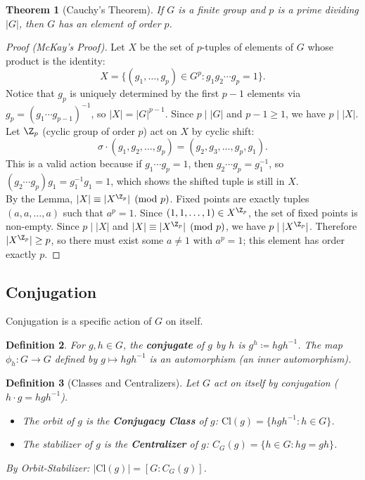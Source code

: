 \documentclass[a4paper,12pt]{article}
\newtheorem{thm}{Theorem}[section]
\newtheorem{defn}[thm]{Definition}
\begin{document}
\begin{thm}[Cauchy's Theorem]
    If $G$ is a finite group and $p$ is a prime dividing $|G|$, then $G$ has an element of order $p$.
\end{thm}
\begin{proof}[Proof (McKay's Proof)]
    Let $X$ be the set of $p$-tuples of elements of $G$ whose product is the identity:
    \[ X = \{(g_1, \dots, g_p) \in G^p : g_1 g_2 \cdots g_p = 1\}. \]
    Notice that $g_p$ is uniquely determined by the first $p-1$ elements via $g_p = (g_1 \cdots g_{p-1})^{-1}$, so $|X| = |G|^{p-1}$. Since $p \mid |G|$ and $p-1 \geq 1$, we have $p \mid |X|$. \\
    Let $\Z_p$ (cyclic group of order $p$) act on $X$ by cyclic shift:
    \[ \sigma \cdot (g_1, g_2, \dots, g_p) = (g_2, g_3, \dots, g_p, g_1). \]
    This is a valid action because if $g_1 \cdots g_p = 1$, then $g_2 \cdots g_p = g_1^{-1}$, so $(g_2 \cdots g_p) g_1 = g_1^{-1} g_1 = 1$, which shows the shifted tuple is still in $X$.\\
    By the Lemma, $|X| \equiv |X^{\Z_p}| \pmod{p}$. Fixed points are exactly tuples $(a, a, \dots, a)$ such that $a^p = 1$. Since $(1, 1, \dots, 1) \in X^{\Z_p}$, the set of fixed points is non-empty. Since $p \mid |X|$ and $|X| \equiv |X^{\Z_p}| \pmod p$, we have $p \mid |X^{\Z_p}|$. Therefore $|X^{\Z_p}| \geq p$, so there must exist some $a \neq 1$ with $a^p = 1$; this element has order exactly $p$.
\end{proof}

\subsection{Conjugation}

Conjugation is a specific action of $G$ on itself.

\begin{defn}
    For $g, h \in G$, the \textbf{conjugate} of $g$ by $h$ is $g^h \coloneqq hgh^{-1}$.
    The map $\phi_h: G \to G$ defined by $g \mapsto hgh^{-1}$ is an automorphism (an inner automorphism).
\end{defn}

\begin{defn}[Classes and Centralizers]
    Let $G$ act on itself by conjugation ($h \cdot g = hgh^{-1}$).
    \begin{itemize}
        \item The orbit of $g$ is the \textbf{Conjugacy Class} of $g$: $\text{Cl}(g) = \{hgh^{-1} : h \in G\}$.
        \item The stabilizer of $g$ is the \textbf{Centralizer} of $g$: $C_G(g) = \{h \in G : hg = gh\}$.
    \end{itemize}
    By Orbit-Stabilizer: $|\text{Cl}(g)| = [G : C_G(g)]$.
\end{defn}
\end{document}
